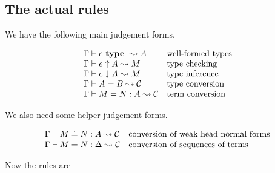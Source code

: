 
\subsection{The actual rules}

We have the following main judgement forms.

\[\begin{array}{ll}
    {\Gamma} \vdash {e} ~ \mathbf{type} ~ \leadsto {A} & \mbox{well-formed types} \\
    {\Gamma} \vdash {e} \uparrow {A} \leadsto {M} & \mbox{type checking} \\
    {\Gamma} \vdash {e} \downarrow {A} \leadsto {M} & \mbox{type inference} \\
    {\Gamma} \vdash {A} = {B} \leadsto {\mathcal{C}} & \mbox{type conversion} \\
    {\Gamma} \vdash {M} = {N} : {A} \leadsto {\mathcal{C}} & \mbox{term conversion} \\
\end{array}\]

We also need some helper judgement forms.

\[\begin{array}{ll}
    {\Gamma} \vdash {M} \doteq {N} : {A} \leadsto {\mathcal{C}} & \mbox{conversion of weak head normal forms} \\
    {\Gamma} \vdash {\bar M} = {\bar N} : {\Delta} \leadsto {\mathcal{C}} & \mbox{conversion of sequences of terms} \\
\end{array}\]

Now the rules are



